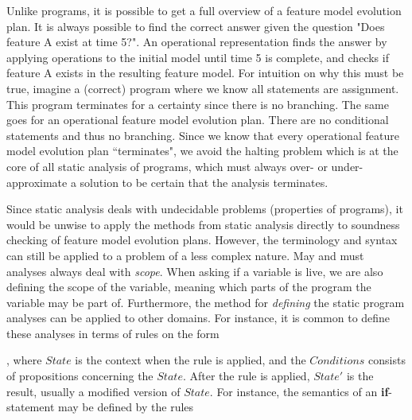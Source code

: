 Unlike programs, it is possible to get a full overview of a feature model evolution plan. It is always possible to find the correct answer given the question "Does feature A exist at time 5?". An operational representation finds the answer by applying operations to the initial model until time 5 is complete, and checks if feature A exists in the resulting feature model. For intuition on why this must be true, imagine a (correct) program where we know all statements are assignment. This program terminates for a certainty since there is no branching. The same goes for an operational feature model evolution plan. There are no conditional statements and thus no branching. Since we know that every operational feature model evolution plan ``terminates", we avoid the halting problem which is at the core of all static analysis of programs, which must always over- or under-approximate a solution to be certain that the analysis terminates.

Since static analysis deals with undecidable problems (properties of programs), it would be unwise to apply the methods from static analysis directly to soundness checking of feature model evolution plans. However, the terminology and syntax can still be applied to a problem of a less complex nature. May and must analyses always deal with \emph{scope}. When asking if a variable is live, we are also defining the scope of the variable, meaning which parts of the program the variable may be part of. Furthermore, the method for \emph{defining} the static program analyses can be applied to other domains. For instance, it is common to define these analyses in terms of rules on the form

\begin{prooftree}
\end{prooftree}

, where $State$ is the context when the rule is applied, and the $Conditions$ consists of propositions concerning the $State$. After the rule is applied, $State'$ is the result, usually a modified version of $State$. For instance, the semantics of an \textbf{if}-statement may be defined by the rules

\begin{minipage}{0.5\textwidth}
   \footnotesize
\begin{prooftree}
\end{prooftree}
\end{minipage}
\begin{minipage}{0.5\textwidth}
   \footnotesize
\begin{prooftree}
\end{prooftree}
\end{minipage}

